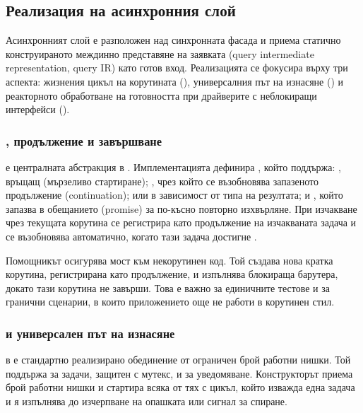 \subsection{Реализация на асинхронния слой}
\label{subsec:async_implementation}

Асинхронният слой е разположен над синхронната фасада  и приема статично конструираното междинно представяне на заявката (query intermediate representation, query IR) като готов вход. Реализацията се фокусира върху три аспекта: жизнения цикъл на корутината (), универсалния път на изнасяне () и реакторното обработване на готовността при драйверите с неблокиращи интерфейси ().

\subsubsection{, продължение и завършване}

 е централната абстракция в . Имплементацията дефинира , който поддържа: , връщащ  (мързеливо стартиране); , чрез който се възобновява запазеното продължение (continuation);  или  в зависимост от типа на резултата; и , който запазва  в обещанието (promise) за по-късно повторно изхвърляне. При изчакване чрез  текущата корутина се регистрира като продължение на изчакваната задача и се възобновява автоматично, когато тази задача достигне .

Помощникът  осигурява мост към некорутинен код. Той създава нова кратка корутина, регистрирана като продължение, и изпълнява блокираща барутера, докато тази корутина не завърши. Това е важно за единичните тестове и за гранични сценарии, в които приложението още не работи в корутинен стил.

\subsubsection{ и универсален път на изнасяне}

 в  е стандартно реализирано обединение от ограничен брой работни нишки. Той поддържа  за задачи, защитен с мутекс, и  за уведомяване. Конструкторът приема брой работни нишки и стартира всяка от тях с цикъл, който изважда една задача и я изпълнява до изчерпване на опашката или сигнал за спиране.

